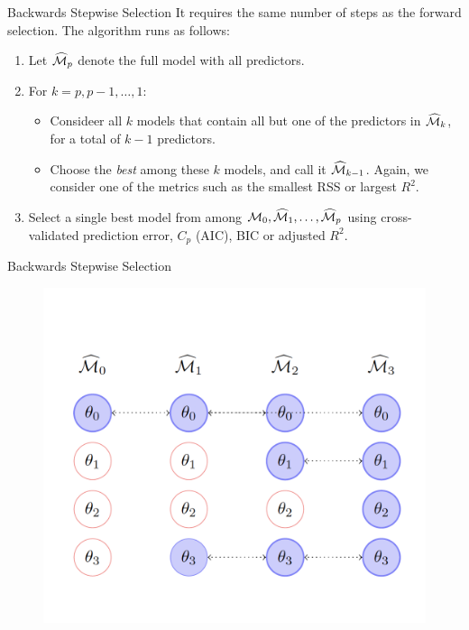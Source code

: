 \documentclass{beamer}
\begin{document}
\begin{frame}{Backwards Stepwise Selection}
	It requires the same number of steps as the forward selection. The algorithm runs as follows:
	
	\begin{enumerate}
		\item Let $\widehat{\cal M}_p$  denote the full model with all predictors.
		\item For $k=p,p-1,\ldots,1$:
		\begin{itemize}
			\item Consideer all $k$ models that contain all but one of the predictors in $\widehat{\cal M}_k$, for a total of $k-1$ predictors.
			\item Choose the {\it best} among these $k$ models, and call it $\widehat{\cal M}_{k-1}$. Again, we consider one of the metrics such as the smallest RSS or largest $R^2$.
		\end{itemize}
	 \item Select a single best model from among ${\cal M}_0,\widehat{\cal M}_1, \ldots, \widehat{\cal M}_p$ using cross-validated prediction error, $C_p$ (AIC), BIC or adjusted $R^2$.
	\end{enumerate}
\end{frame}

\begin{frame}{Backwards Stepwise Selection}
	
	\begin{figure}[h]
		\centering
		\includegraphics[scale=0.5]{../../Figures/fig_backwards.png}
	\end{figure}
\end{frame}
\end{document}
